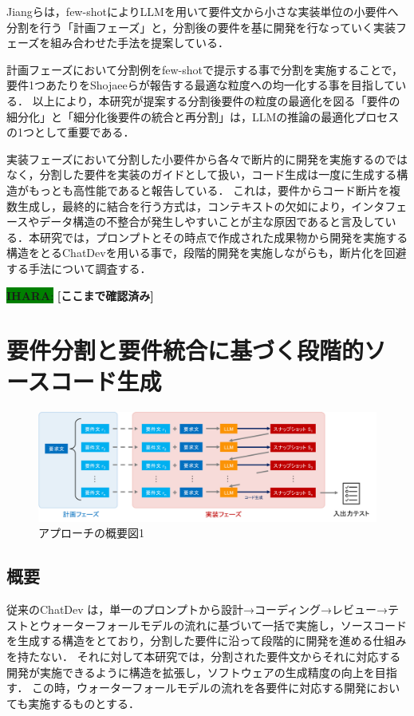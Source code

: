 \documentclass[submit,techrep,noauthor]{ipsj}
\newcommand{\ihara}[1]{\colorbox{green}{{\bf IHARA}:}{\color{blue} {\textbf{[#1]}}}}
\begin{document}
Jiangら\cite{tosem}は，few-shotによりLLMを用いて要件文から小さな実装単位の小要件へ分割を行う「計画フェーズ」と，分割後の要件を基に開発を行なっていく実装フェーズを組み合わせた手法を提案している．

計画フェーズにおいて分割例をfew-shotで提示する事で分割を実施することで，要件1つあたりをShojaeeらが報告する最適な粒度への均一化する事を目指している．
以上により，本研究が提案する分割後要件の粒度の最適化を図る「要件の細分化」と「細分化後要件の統合と再分割」は，LLMの推論の最適化プロセスの1つとして重要である．

実装フェーズにおいて分割した小要件から各々で断片的に開発を実施するのではなく，分割した要件を実装のガイドとして扱い，コード生成は一度に生成する構造がもっとも高性能であると報告している．
これは，要件からコード断片を複数生成し，最終的に結合を行う方式は，コンテキストの欠如により，インタフェースやデータ構造の不整合が発生しやすいことが主な原因であると言及している．本研究では，プロンプトとその時点で作成された成果物から開発を実施する構造をとるChatDevを用いる事で，段階的開発を実施しながらも，断片化を回避する手法について調査する．


\ihara{ここまで確認済み}

\section{要件分割と要件統合に基づく段階的ソースコード生成}
\label{sec:method}

\begin{figure}[t]
    \centering
    \includegraphics[width=1.0\linewidth]{./Toyoshima_fig/approach_abst_v2.pdf}
    \caption{アプローチの概要図1}
    \label{approach_abst}
\end{figure}

\subsection{概要}
従来のChatDev\cite{qian-etal-2024-chatdev} は，単一のプロンプトから設計→コーディング→レビュー→テストとウォーターフォールモデルの流れに基づいて一括で実施し，ソースコードを生成する構造をとており，分割した要件に沿って段階的に開発を進める仕組みを持たない．
それに対して本研究では，分割された要件文からそれに対応する開発が実施できるように構造を拡張し，ソフトウェアの生成精度の向上を目指す．
この時，ウォーターフォールモデルの流れを各要件に対応する開発においても実施するものとする．
\end{document}
